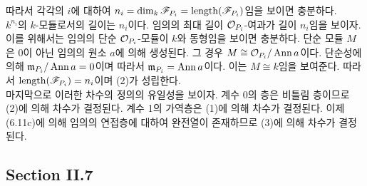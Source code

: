 \begin{enumerate}[label=\tb{6.\arabic*.},itemindent=0mm,itemsep=4mm]
	따라서 각각의 $i$에 대하여 $n_i=\dim_k\mathscr{F}_{P_i}=\operatorname{length}(\mathscr{F}_{P_i})$임을 보이면 충분하다.\\
	$k^{n_i}$의 $k$-모듈로서의 길이는 $n_i$이다. 임의의 최대 길이 $\mathcal{O}_{P_i}$-여과가 길이 $n_i$임을 보이자.
	이를 위해서는 임의의 단순 $\mathcal{O}_{P_i}$-모듈이 $k$와 동형임을 보이면 충분하다.
	단순 모듈 $M$은 0이 아닌 임의의 원소 $a$에 의해 생성된다. 그 경우 $M\cong\mathcal{O}_{P_i}/\operatorname{Ann} a$이다.
	단순성에 의해 $\mathfrak{m}_{P_i}/\operatorname{Ann} a=0$이며 따라서 $\mathfrak{m}_{P_i}=\operatorname{Ann} a$이다.
	이는 $M\cong k$임을 보여준다. 따라서 $\operatorname{length}(\mathscr{F}_{P_i})=n_i$이며 (2)가 성립한다.\\
	마지막으로 이러한 차수의 정의의 유일성을 보이자. 계수 0의 층은 비틀림 층이므로 (2)에 의해 차수가 결정된다.
	계수 1의 가역층은 (1)에 의해 차수가 결정된다.
	이제 (6.11c)에 의해 임의의 연접층에 대하여 완전열이 존재하므로 (3)에 의해 차수가 결정된다.
	\end{enumerate}
	
	
	\subsection*{Section II.7}
	

